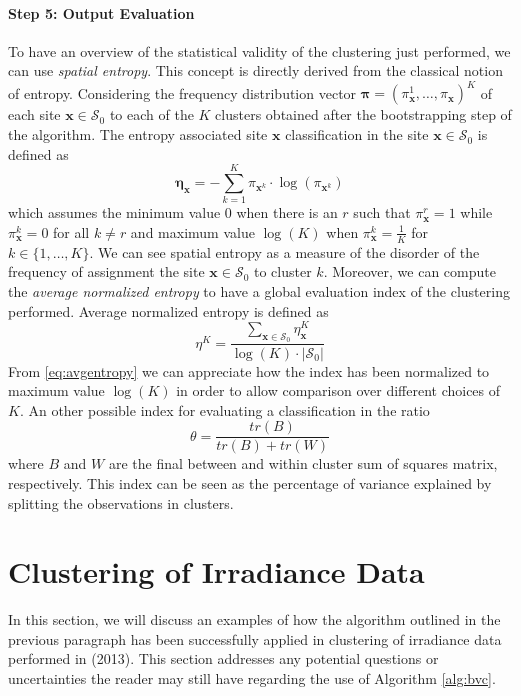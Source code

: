 \paragraph{Step 5: Output Evaluation} To have an overview of the statistical validity of the clustering just performed, we can use \textit{spatial entropy}. This concept is directly derived from the classical notion of entropy. Considering the frequency distribution vector $\boldsymbol{\pi}=(\pi_{\mathbf{x}}^1,\dots,\pi_{\mathbf{x}})^K$ of each site $\mathbf{x} \in \mathcal{S}_0$ to each of the $K$ clusters obtained after the bootstrapping step of the algorithm. The entropy associated site $\mathbf{x}$ classification in the site $\mathbf{x}\in\mathcal{S}_0$ is defined as
\begin{equation}
\mathbf{\eta}_{\mathbf{x}}=-\sum_{k=1}^K\pi_{\mathbf{x}^k}\cdot \log(\pi_{\mathbf{x}^k})
\end{equation}
which assumes the minimum value 0 when there is an $r$ such that $\pi_{\mathbf{x}}^r=1$ while $\pi_{\mathbf{x}}^k=0$ for all $k\neq r$ and maximum value $\log(K)$ when $\pi_{\mathbf{x}}^k=\frac{1}{K}$ for $k\in\{1,\dots,K\}$. We can see spatial entropy as a measure of the disorder of the frequency of assignment the site $\mathbf{x}\in\mathcal{S}_0$ to cluster $k$. Moreover, we can compute the \textit{average normalized entropy} to have a global evaluation index of the clustering performed. Average normalized entropy is defined as
\begin{equation}
\label{eq:avgentropy}
    \eta^K=\frac{\sum_{\textbf{x}\in\mathcal{S}_0}\eta_{\mathbf{x}}^K}{\log(K)\cdot |\mathcal{S}_0|}
\end{equation}
From \ref{eq:avgentropy} we can appreciate how the index has been normalized to maximum value $\log(K)$ in order to allow comparison over different choices of $K$. An other possible index for evaluating a classification in the ratio
\begin{equation}
    \label{eq:theta}
    \theta=\frac{tr(B)}{tr(B)+tr(W)}
\end{equation}
where $B$ and $W$ are the final between and within cluster sum of squares matrix, respectively. This index can be seen as the percentage of variance explained by splitting the observations in clusters.


\section{Clustering of Irradiance Data}
\label{sec:irradiance}
In this section, we will discuss an examples of how the algorithm outlined in the previous paragraph has been successfully applied in clustering of irradiance data performed in \citeauthor{secchi_bagging_2013} (2013). This section addresses any potential questions or uncertainties the reader may still have regarding the use of Algorithm \ref{alg:bvc}. 


